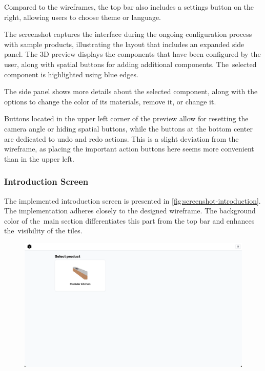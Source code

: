 Compared to the wireframes, the top bar also includes a settings button on the right, allowing users to choose theme or language.

The screenshot captures the interface during the ongoing configuration process with sample products, illustrating the layout that includes an expanded side panel. The 3D preview displays the components that have been configured by the user, along with spatial buttons for adding additional components. The~selected component is highlighted using blue edges.

The side panel shows more details about the selected component, along with the options to change the color of its materials, remove it, or change it.

Buttons located in the upper left corner of the preview allow for resetting the camera angle or hiding spatial buttons, while the buttons at the bottom center are dedicated to undo and redo actions. This is a slight deviation from the wireframe, as placing the important action buttons here seems more convenient than in the upper left.


\subsubsection{Introduction Screen}

The implemented introduction screen is presented in \autoref{fig:screenshot-introduction}. The implementation adheres closely to the designed wireframe. The background color of the~main section differentiates this part from the top bar and enhances the~visibility of the tiles.

\begin{figure}[h]
\centering
\includegraphics[width=\textwidth]{images/screenshot_introduction.png}
\label{fig:screenshot-introduction}
\end{figure}

